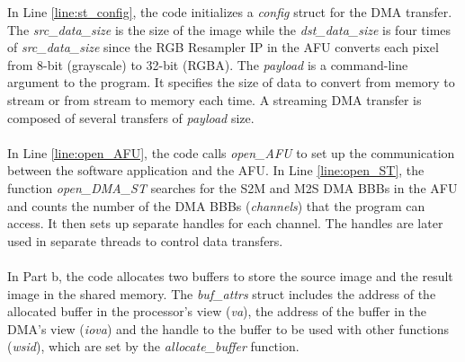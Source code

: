 \documentclass[11pt, twoside, pdftex]{article}
\begin{document}
 
 In Line \ref{line:st_config}, the code initializes a {\it config} struct for the DMA transfer. The {\it src\_data\_size} is the size of the image while the {\it dst\_data\_size} is four times of {\it src\_data\_size} since the RGB Resampler IP in the AFU converts each pixel from 8-bit (grayscale) to 32-bit (RGBA). The {\it payload} is a command-line argument to the program. It specifies the size of data to convert from memory to stream or from stream to memory each time. A streaming DMA transfer is composed of several transfers of {\it payload} size.\\
 \\
 In Line \ref{line:open_AFU}, the code calls {\it open\_AFU} to set up the communication between the software application and the AFU. In Line \ref{line:open_ST}, the function {\it open\_DMA\_ST} searches for the S2M and M2S DMA BBBs in the AFU and counts the number of the DMA BBBs ({\it channels}) that the program can access. It then sets up separate handles for each channel. The handles are later used in separate threads to control data transfers.\\
 \\
 In Part b, the code allocates two buffers to store the source image and the result image in the shared memory. The {\it buf\_attrs} struct includes the address of the allocated buffer in the processor's view ({\it va}),  the address of the buffer in the DMA's view ({\it iova}) and the handle to the buffer to be used with other functions ({\it wsid}), which are set by the {\it allocate\_buffer} function.
 
\end{document}
